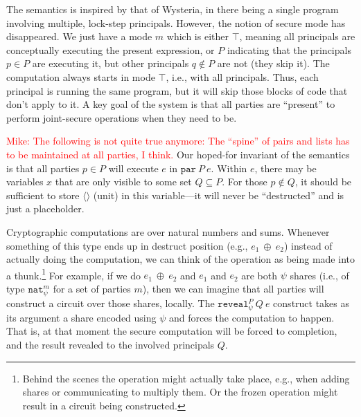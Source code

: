 \documentclass[10pt]{article}
\newcommand{\kw}[1]{\ensuremath{\mathtt{#1}}}
\newcommand{\tnat}{\ensuremath{\mathtt{nat}}}
\newcommand{\tprod}[2]{\ensuremath{{#1} \times {#2}}}
\newcommand{\tsum}[3]{\ensuremath{{#1} +^{#3} {#2}}}
\newcommand{\ebinop}[2]{\ensuremath{{#1}~\oplus~{#2}}}
\newcommand{\epar}[2]{\ensuremath{\kw{par}~{#1}~{#2}}}
\newcommand{\ereveal}[4]{\ensuremath{\kw{reveal}^{#1}_{#4}~{#2}~{#3}}}
\newcommand{\emux}[3]{\ensuremath{\kw{mux}~{#1}~\kw{?}~{#2}~\kw{:}~{#3}}}
\newcommand{\mwh}[1]{\textcolor{red}{Mike: #1}}
\begin{document}
\begin{figure}
\end{figure}

The semantics is inspired by that of Wysteria, in there being a single
program involving multiple, lock-step principals. However, the notion
of secure mode has disappeared. We just have a mode $m$ which is
either $\top$, meaning all principals are conceptually executing the
present expression, or $P$ indicating that the principals
$p \in P$ are executing it, but other principals $q \not\in P$ are not
(they skip it). The computation always starts in mode $\top$, i.e.,
with all principals. Thus, each principal is running the same program,
but it will skip those blocks of code that don't apply to it.  A key
goal of the system is that all parties are ``present'' to perform
joint-secure operations when they need to be.

\mwh{The following is not quite true anymore: The ``spine'' of pairs
  and lists has to be maintained at all parties, I think.}
Our hoped-for invariant of the semantics is that all parties $p \in P$
will execute $e$ in $\epar{P}{e}$. Within $e$, there may be variables
$x$ that are only visible to some set $Q \subseteq P$. For those
$p \not\in Q$, it should be sufficient to store $\langle \rangle$
(unit) in this variable---it will never be ``destructed'' and is just
a placeholder.

Cryptographic computations are over natural numbers and sums. Whenever
something of this type ends up in destruct position (e.g.,
$\ebinop{e_1}{e_2}$) instead of actually doing the computation, we can
think of the operation as being made into a thunk.\footnote{Behind the
  scenes the operation might actually take place, e.g., when adding
  shares or communicating to multiply them. Or the frozen operation
  might result in a circuit being constructed.} For example, if we do
$\ebinop{e_1}{e_2}$ and $e_1$ and $e_2$ are both $\psi$ shares (i.e.,
of type $\tnat^m_\psi$ for a set of parties $m$), then we can imagine
that all parties will construct a circuit over those shares,
locally. The $\ereveal{P}{Q}{e}{\psi}$ construct takes as its argument
a share encoded using $\psi$ and forces the computation to
happen. That is, at that moment the secure computation will be forced
to completion, and the result revealed to the involved principals $Q$.

\end{document}
